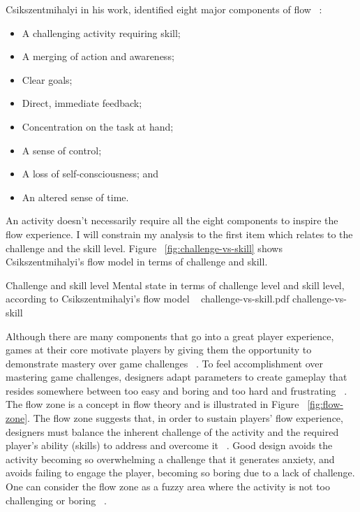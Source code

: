 Csikszentmihalyi in his work, identified eight major components of flow ~\cite{csikszentmihalyi1990flow}:

\begin{itemize}
\item A challenging activity requiring skill;
\item A merging of action and awareness;
\item Clear goals;
\item Direct, immediate feedback;
\item Concentration on the task at hand;
\item A sense of control;
\item A loss of self-consciousness; and
\item An altered sense of time.
\end{itemize}

An activity doesn't necessarily require all the eight components to inspire the flow experience. I will constrain my analysis to the first item which relates to the challenge and the skill level. Figure ~\ref{fig:challenge-vs-skill} shows Csikszentmihalyi's flow model in terms of challenge and skill.

\img
{Challenge and skill level}
{Mental state in terms of challenge level and skill level, according to Csikszentmihalyi's flow model ~\cite{csikszentmihalyi1997finding}}
{challenge-vs-skill.pdf}
{challenge-vs-skill}

Although there are many components that go into a great player experience, games at their core motivate players by giving them the opportunity to demonstrate mastery over game challenges ~\cite{ryan2006motivational}. To feel accomplishment over mastering game challenges, designers adapt parameters to create gameplay that resides somewhere between too easy and boring and too hard and frustrating ~\cite{koster2013theory}. The flow zone is a concept in flow theory and is illustrated in Figure ~\ref{fig:flow-zone}. The flow zone suggests that, in order to sustain players' flow experience, designers must balance the inherent challenge of the activity and the required player's ability (skills) to address and overcome it ~\cite{chen2007flow}. Good design avoids the activity becoming so overwhelming a challenge that it generates anxiety, and avoids failing to engage the player, becoming so boring due to a lack of challenge. One can consider the flow zone as a fuzzy area where the activity is not too challenging or boring ~\cite{csikszentmihalyi1990flow}.

